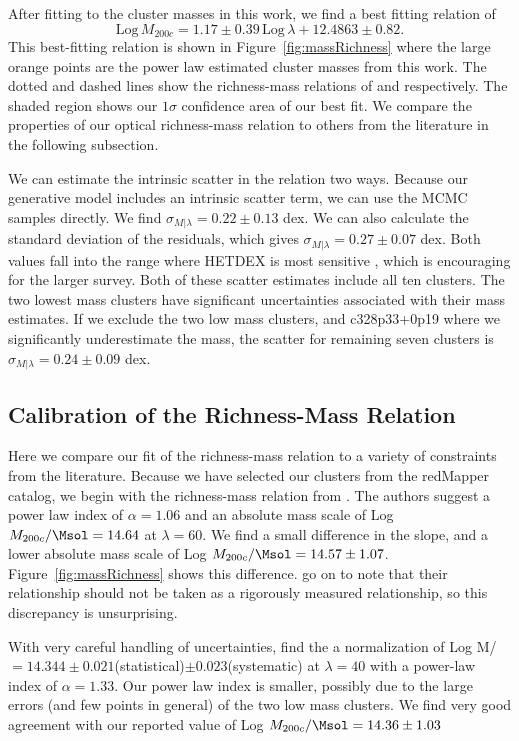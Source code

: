After fitting to the cluster masses in this work, we find a best fitting relation of
\begin{equation}\label{eq: best fit}
 \mathrm{Log}\,M_{200c}=1.17\pm{0.39}\, \mathrm{Log}\,\lambda + 12.4863\pm{0.82}. 
\end{equation}
This best-fitting relation is shown in Figure~\ref{fig:massRichness} where the large orange points are the power law estimated cluster masses from this work. The dotted and dashed lines show the richness-mass relations of \cite{Rykoff2012} and \cite{Farahi2016} respectively. The shaded region shows our $1\sigma$ confidence area of our best fit. We compare the properties of our optical richness-mass relation to others from the literature in the following subsection.

We can estimate the intrinsic scatter in the relation two ways. Because our generative model includes an intrinsic scatter term, we can use the MCMC samples directly. We find $\sigma_{M|\lambda} = 0.22\pm0.13$ dex. We can also calculate the standard deviation of the residuals, which gives  $\sigma_{M|\lambda} = 0.27\pm0.07$ dex. Both values fall into the range where HETDEX is most sensitive , which is encouraging for the larger survey. Both of these scatter estimates include all ten clusters. The two lowest mass clusters have significant uncertainties associated with their mass estimates. If we exclude the two low mass clusters, and c328p33+0p19 where we significantly underestimate the mass, the scatter for remaining seven clusters is $\sigma_{M|\lambda} = 0.24\pm0.09$ dex.

\subsection{Calibration of the Richness-Mass Relation}
Here we compare our fit of the richness-mass relation to a variety of constraints from the literature. Because we have selected our clusters from the redMapper catalog, we begin with the richness-mass relation from \cite{Rykoff2012}. The authors suggest a power law index of $\alpha=1.06$ and an absolute mass scale of Log $M_{200c}/\Msol=14.64$ at $\lambda=60$. We find a small difference in the slope, and a lower absolute mass scale of Log $M_{200c}/\Msol = 14.57\pm1.07$. Figure~\ref{fig:massRichness} shows this difference. \cite{Rykoff2012} go on to note that their relationship should not be taken as a rigorously measured relationship, so this discrepancy is unsurprising. 

With very careful handling of uncertainties, \cite{Simet2016} find the a normalization of Log M/\Msol\ $=14.344\pm0.021$(statistical)$\pm0.023$(systematic) at $\lambda=40$ with a power-law index of $\alpha=1.33$. Our power law index is smaller, possibly due to the large errors (and few points in general) of the two low mass clusters. We find very good agreement with our reported value of Log $M_{200c}/\Msol = 14.36\pm1.03$

